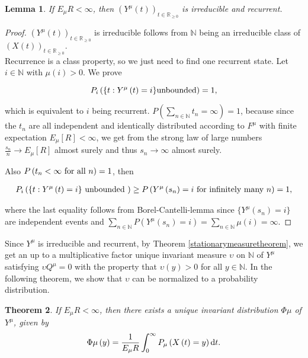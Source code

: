 \documentclass[12pt,a4paper]{scrartcl}
\newtheorem{theorem}{Theorem}[section]
\newtheorem{lemma}[theorem]{Lemma}
\numberwithin{equation}{section}
\newcommand{\R}{\mathbb{R}} %
\newcommand{\N}{\mathbb{N}} %
\begin{document}
\begin{lemma} If $E_{\mu} R < \infty$, then
$ \left(Y^{\mu}\left(t\right)\right)_{t \in \R_{\geq 0}} $ is irreducible and recurrent.
\end{lemma}
\begin{proof}
$ \left(Y^{\mu}\left(t\right)\right)_{t \in \R_{\geq 0}}  $ is irreducible follows from $\N$ being an irreducible class of $ \left(X\left(t\right)\right)_{t \in \R_{\geq 0}}.$\\[2ex]
Recurrence is a class property, so we just need to find one recurrent state.
Let $ i \in \N$ with $ \mu\left(i\right) > 0 $. We prove

$$ P_i\left( \lbrace t: Y^{\mu}\left(t\right) = i \rbrace  \textnormal{unbounded} \right) = 1,$$

which is equivalent to $i$ being recurrent. $ P\left( \sum_{n \in \N} t_n = \infty \right) = 1 $, because since the $ t_n $ are all independent and identically distributed according to $ F^{\mu} $ with finite expectation $ E_{\mu} \left[R\right] < \infty $, we get from the strong law of large numbers $ \frac{s_n}{n} \to E_{\mu} \left[R\right] $ almost surely and thus $ s_n \to \infty $ almost surely.

 Also $ P\left(t_n < \infty \textnormal{ for all } n\right) = 1 $, then

\begin{align*}
P_i\left( \lbrace t: Y^{\mu}\left(t\right) = i \rbrace  \textnormal{ unbounded }\right) \geq P\left(Y^{\mu}\left(s_n\right)=i \textnormal{ for infinitely many } n \right) = 1,
\end{align*}

where the last equality follows from Borel-Cantelli-lemma since $ \lbrace Y^{\mu}\left(s_n\right)=i \rbrace  $ are independent events and $ \sum_{n \in \N} P\left(Y^{\mu}\left(s_n\right) = i \right) = \sum_{n \in \N} \mu\left(i\right) = \infty $.
 
\end{proof}


Since $ Y^{\mu} $ is irreducible and recurrent, by Theorem \ref{stationarymeasuretheorem}, we get an up to a multiplicative factor unique invariant measure $ \upsilon $ on $\N$ of $ Y^{\mu} $ satisfying $ \upsilon Q^{\mu} = 0 $ with the property that $\upsilon\left(y\right) > 0$ for all $y \in \N.$ In the following theorem, we show that $ \upsilon $ can be normalized to a probability distribution.
\begin{theorem} \label{thphimu}
If $E_{\mu} R <\infty$, then there exists a unique invariant distribution $\Phi\mu$ of $Y^{\mu}$, given by 
\begin{equation}
\label{phimu}
\Phi\mu\left(y\right) = \frac{1}{E_{\mu}R} \int_{0}^{\infty} P_{\mu}\left(X\left(t\right) = y\right) \textnormal{d} t. 
\end{equation}
\end{theorem}
\end{document}

